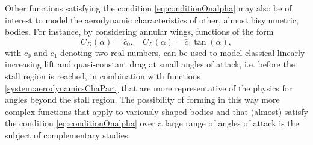 \documentclass[twocolumn]{autart}
\theoremstyle{definition}
\theoremstyle{definition}
\begin{document}
Other functions satisfying the condition \eqref{eq:conditionOnalpha} may also be of interest to model the aerodynamic characteristics of other, almost bisymmetric, bodies. For instance, by considering annular wings, functions of the form \[C_D(\alpha)=\bar{c}_0, \quad C_L(\alpha)=\bar{c}_1 \tan(\alpha),\] 
with $\bar{c}_0$ and $\bar{c}_1$ denoting two real numbers, can be used to model classical linearly increasing lift and quasi-constant drag at small angles of attack, i.e. before the stall region is reached, in combination with functions \eqref{system:aerodynamicsChaPart} that are more representative of the physics for angles beyond the stall region. The possibility of forming in this way more complex functions that apply to variously shaped bodies and that (almost) satisfy the condition \eqref{eq:conditionOnalpha} over a large range of angles of attack is the subject of complementary studies.     
\end{document}
